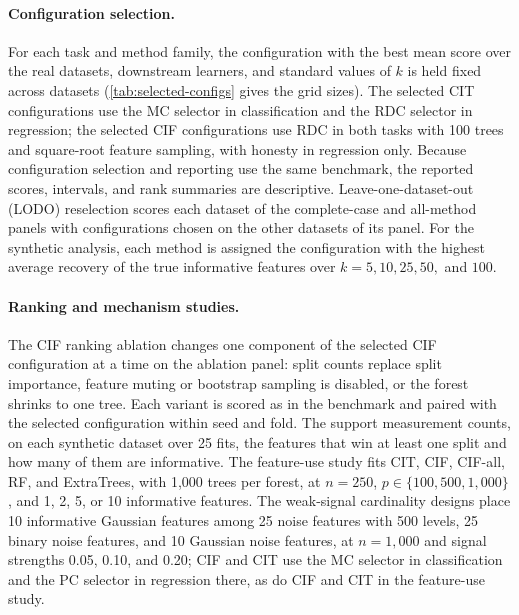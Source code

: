 \paragraph{Configuration selection.}
\label{sec:experiments-repro}%
For each task and method family, the
configuration with the best mean score over the real datasets, downstream
learners, and standard values of $k$ is held fixed across datasets
(\cref{tab:selected-configs} gives the grid sizes). The
selected CIT configurations use the MC selector in classification and the RDC
selector in regression; the selected CIF configurations use RDC in both tasks
with 100 trees and square-root feature sampling, with honesty in regression
only. Because configuration selection and
reporting use the same benchmark, the reported scores, intervals, and rank
summaries are descriptive. Leave-one-dataset-out (LODO) reselection scores each
dataset of the
complete-case and all-method panels with configurations chosen on the other
datasets of its panel. For the synthetic analysis, each method is assigned the
configuration with the highest average recovery of the true informative
features over $k = 5, 10, 25, 50,$ and $100$.

\paragraph{Ranking and mechanism studies.}
\label{sec:experiments-ablations}%
The CIF ranking ablation changes one component of the selected CIF
configuration at a time on the ablation panel: split counts replace split
importance, feature muting or bootstrap sampling is disabled, or the forest
shrinks to one tree. Each variant is scored as in the benchmark and paired with
the selected configuration within seed and fold.
\label{sec:experiments-mechanism}%
The support measurement counts, on each synthetic dataset over 25 fits, the
features that win at least one split and how many of them are informative. The
feature-use study fits CIT, CIF, CIF-all, RF, and ExtraTrees, with 1,000 trees
per forest, at $n=250$, $p \in \{100, 500, 1{,}000\}$, and 1, 2, 5, or 10
informative features. The weak-signal cardinality designs place 10 informative
Gaussian features among 25 noise features with 500 levels, 25 binary noise
features, and 10 Gaussian noise features, at $n=1{,}000$ and signal strengths
0.05, 0.10, and 0.20; CIF and CIT use the MC selector in classification and the
PC selector in regression there, as do CIF and CIT in the feature-use study.

